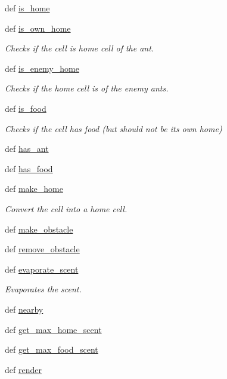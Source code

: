 \begin{DoxyCompactItemize}
\item 
def \hyperlink{classworld_1_1Cell_a441597e0ea2cff7fce907a12fd8216fa}{is\+\_\+home}
\item 
def \hyperlink{classworld_1_1Cell_a1a209720a46e372099e2a301f7e0f6e6}{is\+\_\+own\+\_\+home}
\begin{DoxyCompactList}\small\item\em Checks if the cell is home cell of the ant. \end{DoxyCompactList}\item 
def \hyperlink{classworld_1_1Cell_ad242f10cc8c92971200dd9c8bcf5297b}{is\+\_\+enemy\+\_\+home}
\begin{DoxyCompactList}\small\item\em Checks if the home cell is of the enemy ants. \end{DoxyCompactList}\item 
def \hyperlink{classworld_1_1Cell_a90eabca5d79eef89b2ae4f677a88a93b}{is\+\_\+food}
\begin{DoxyCompactList}\small\item\em Checks if the cell has food (but should not be its own home) \end{DoxyCompactList}\item 
def \hyperlink{classworld_1_1Cell_a98e3cac3c42374693afe0aded7a1e06c}{has\+\_\+ant}
\item 
def \hyperlink{classworld_1_1Cell_a1097df1a6fe0131898377358017fe7bc}{has\+\_\+food}
\item 
def \hyperlink{classworld_1_1Cell_adb830df07e437189375efa6c9ad4981e}{make\+\_\+home}
\begin{DoxyCompactList}\small\item\em Convert the cell into a home cell. \end{DoxyCompactList}\item 
def \hyperlink{classworld_1_1Cell_a63164a3e74888a97b07ee8e06c633c2a}{make\+\_\+obstacle}
\item 
def \hyperlink{classworld_1_1Cell_aed89295fdffe763b9d651b9def6ca4e8}{remove\+\_\+obstacle}
\item 
def \hyperlink{classworld_1_1Cell_add0fb2c9e6c963d012cf7e65008b8947}{evaporate\+\_\+scent}
\begin{DoxyCompactList}\small\item\em Evaporates the scent. \end{DoxyCompactList}\item 
def \hyperlink{classworld_1_1Cell_aa564ee06853b2db81faa0da4d07e66af}{nearby}
\item 
def \hyperlink{classworld_1_1Cell_a05eb363f384507bcca4ab3f9680ba8a9}{get\+\_\+max\+\_\+home\+\_\+scent}
\item 
def \hyperlink{classworld_1_1Cell_a7562d15f3a8d223f445a67b89ad60f07}{get\+\_\+max\+\_\+food\+\_\+scent}
\item 
def \hyperlink{classworld_1_1Cell_a11f263897c7a04ae900af84d30a30c56}{render}
\end{DoxyCompactItemize}
